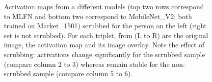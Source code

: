 \begin{figure}
\begin{subfigure}[b]{0.98\textwidth}
        
    \end{subfigure}
    
    
        
    
    
    \caption{\label{fig:reid_sup}Activation maps from a different models (top two rows correspond to MLFN and bottom two correspond to MobileNet\_V2; both trained on Market\_1501) scrubbed for the person on the left (right set is not scrubbed). For each triplet, from (L to R) are the original image, the activation map and its image overlay. Note the effect of scrubbing: activations change significantly for the scrubbed sample (compare column 2 to 3) whereas remain stable for the non-scrubbed sample (compare column 5 to 6).}
\end{figure}






